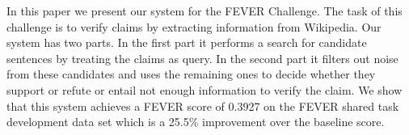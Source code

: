 In this paper we present our system for the FEVER Challenge. The task of this challenge is to verify claims by extracting information from Wikipedia. Our system has two parts. In the first part it performs a search for candidate sentences by treating the claims as query. In the second part it filters out noise from these candidates and uses the remaining ones to decide whether they support or refute or entail not enough information to verify the claim. We show that this system achieves a FEVER score of 0.3927 on the FEVER shared task development data set which is a 25.5\% improvement over the baseline score.
